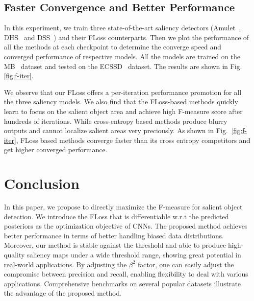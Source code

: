 \documentclass[10pt,twocolumn,letterpaper]{article}
\newcommand{\CheckRmv}[1]{}
\newcommand{\CheckRmv}[1]{#1}
\begin{document}
\subsection{Faster Convergence and Better Performance}
In this experiment, we train three state-of-the-art saliency detectors (Amulet~\cite{zhang2017amulet}, 
DHS~\cite{liu2011learning} and DSS~\cite{hou2017deeply}) and their FLoss counterparts.
%
Then we plot the performance of all the methods at each checkpoint
to determine the converge speed and converged performance of respective models.
%
All the models are trained on the MB~\cite{liu2011learning} dataset
and tested on the ECSSD~\cite{yan2013hierarchical} dataset.
%
The results are shown in Fig.\ref{fig:f-iter}.

\CheckRmv{
\begin{figure}[!h]
  \centering
  \begin{overpic}[width=0.85\linewidth]{figures/f-iter-multiple}
  \end{overpic}
  \caption{Performance versus training iterations.
  Our method presents faster convergence and higher converged performance.}
  \label{fig:f-iter}
      \vspace{-10pt}
\end{figure}
}

We observe that our FLoss offers a per-iteration performance promotion for all the three saliency models.
We also find
that the FLoss-based methods quickly learn to
focus on the salient object area and achieve high F-measure score after hundreds of iterations.
%
While cross-entropy based methods produce blurry outputs and cannot localize
salient areas very preciously.
%
As shown in Fig.~\ref{fig:f-iter}, FLoss based methods converge faster than its cross entropy
competitors and get higher converged performance.

\vspace{-4pt}
\section{Conclusion}
\vspace{-4pt}
In this paper, we propose to directly maximize the F-measure for salient object detection.
%
We introduce the FLoss that is differentiable w.r.t the predicted posteriors
as the optimization objective of CNNs.
%
The proposed method achieves better performance in terms of better handling biased data distributions.
%
Moreover, our method is stable against the threshold and able to produce high-quality saliency maps
under a wide threshold range, showing great potential in real-world applications.
%
By adjusting the $\beta^2$ factor, one can easily adjust the
compromise between precision and recall,
enabling flexibility to deal with various applications.
%
Comprehensive benchmarks on several popular datasets illustrate the advantage of the proposed
method.
\end{document}
